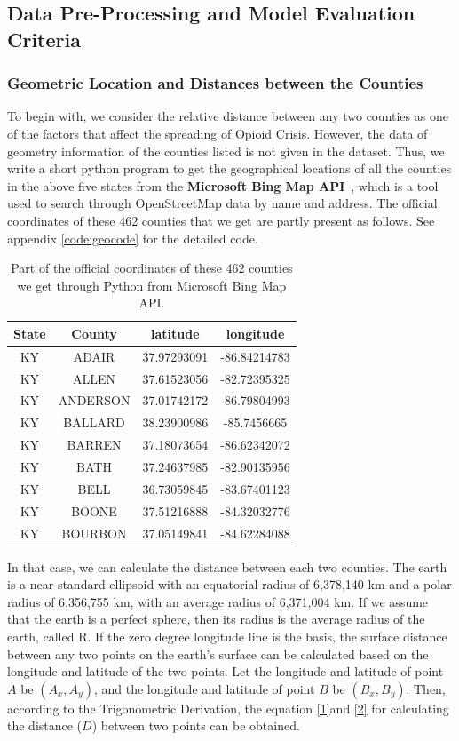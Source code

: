 \documentclass{mcmthesis}
\begin{document}
\subsection{Data Pre-Processing and Model Evaluation Criteria}

\subsubsection{Geometric Location and Distances between the Counties}

To begin with, we consider the relative distance between any two counties as one of the factors that affect the spreading of Opioid Crisis. However, the data of geometry information of the counties listed is not given in the dataset. Thus, we write a short python program to get the geographical locations of all the counties in the above five states from the \textbf{Microsoft Bing Map API}~\cite{bing}, which is a tool used to search through OpenStreetMap data by name and address. The official coordinates of these 462 counties that we get are partly present as follows. See appendix \ref{code:geocode} for the detailed code. 
    
\begin{table}[H]
    \centering
     \caption{Part of the official coordinates of these 462 counties we get through Python from Microsoft Bing Map API.}
    \label{tab:geotable}
    \begin{tabular}{|c|c|c|c|}
        \hline
	State &	County &	latitude &	longitude \\ \hline
	KY &	ADAIR&	37.97293091	&-86.84214783\\
	KY&	ALLEN&	37.61523056&	-82.72395325\\
	KY&	ANDERSON&	37.01742172	&-86.79804993\\
	KY&	BALLARD&	38.23900986	&-85.7456665\\
	KY&	BARREN&	37.18073654&	-86.62342072\\
	KY&	BATH&	37.24637985&	-82.90135956\\
	KY& BELL&	36.73059845&   -83.67401123\\
	KY&	BOONE&	37.51216888&	-84.32032776\\
	KY&	BOURBON	&37.05149841&	-84.62284088\\
\hline
    \end{tabular}
\end{table}    
    


In that case, we can calculate the distance between each two counties. The earth is a near-standard ellipsoid with an equatorial radius of 6,378,140 km and a polar radius of 6,356,755 km, with an average radius of 6,371,004 km. If we assume that the earth is a perfect sphere, then its radius is the average radius of the earth, called R. If the zero degree longitude line is the basis, the surface distance between any two points on the earth's surface can be calculated based on the longitude and latitude of the two points. Let the longitude and latitude of point $A$ be $(A_x, A_y)$, and the longitude and latitude of point $B$ be $(B_x, B_y)$. Then, according to the Trigonometric Derivation, the equation \ref{1}and \ref{2} for calculating the distance ($D$) between two points can be obtained.
\end{document}
